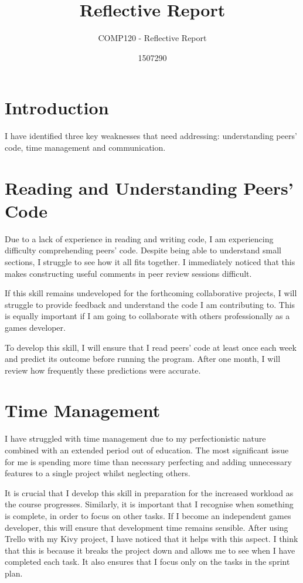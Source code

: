 \documentclass{scrartcl}
\title{Reflective Report}
\subtitle{COMP120 - Reflective Report}
\author{1507290}
\begin{document}
\maketitle

\abstract{}

\section{Introduction}
I have identified three key weaknesses that need addressing: understanding peers' code, time management and communication.

\section{Reading and Understanding Peers' Code}
Due to a lack of experience in reading and writing code, I am experiencing difficulty comprehending peers' code. Despite being able to understand small sections, I struggle to see how it all fits together. I immediately noticed that this makes constructing useful comments in peer review sessions difficult.

If this skill remains undeveloped for the forthcoming collaborative projects, I will struggle to provide feedback and understand the code I am contributing to. This is equally important if I am going to collaborate with others professionally as a games developer.

To develop this skill, I will ensure that I read peers' code at least once each week and predict its outcome before running the program. After one month, I will review how frequently these predictions were accurate.

\section{Time Management}
I have struggled with time management due to my perfectionistic nature combined with an extended period out of education. The most significant issue for me is spending more time than necessary perfecting and adding unnecessary features to a single project whilst neglecting others.

It is crucial that I develop this skill in preparation for the increased workload as the course progresses. Similarly, it is important that I recognise when something is complete, in order to focus on other tasks. If I become an independent games developer, this will ensure that development time remains sensible. After using Trello with my Kivy project, I have noticed that it helps with this aspect. I think that this is because it breaks the project down and allows me to see when I have completed each task. It also ensures that I focus only on the tasks in the sprint plan.
\end{document}
